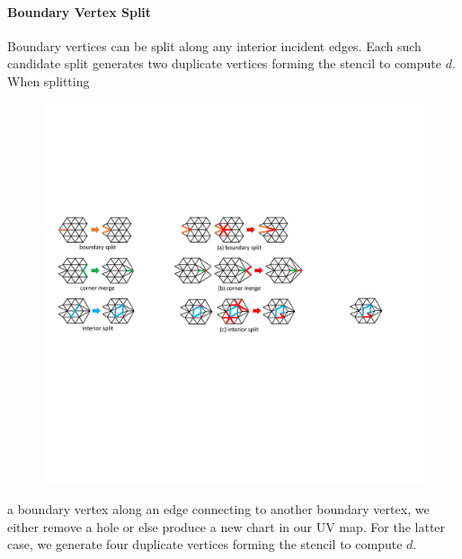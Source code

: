\paragraph{Boundary Vertex Split}
Boundary vertices can be split along any interior incident edges. 
Each such candidate split generates two duplicate vertices forming the stencil to compute $d$.
%
When splitting
%
\begin{figure}
  \begin{center}
  \vspace{-4mm}
    \includegraphics[width=1\linewidth]{fig/bSplit}
  \end{center}
\end{figure}
%
a boundary vertex along an edge connecting to another boundary vertex, we either remove a hole or else produce a new chart in our UV map. For the latter case, we generate four duplicate vertices forming the stencil to compute $d$.

